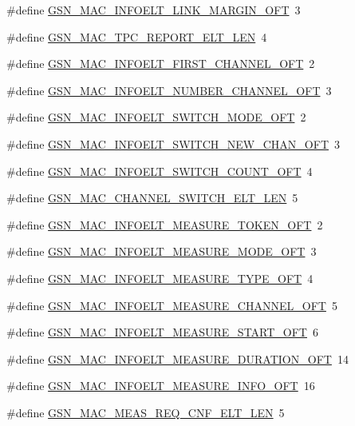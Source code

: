 \begin{DoxyCompactItemize}
\item 
\#define \hyperlink{a00523_ae8b1a15675809717ef0822acbbfeae8c}{GSN\_\-MAC\_\-INFOELT\_\-LINK\_\-MARGIN\_\-OFT}~3
\item 
\#define \hyperlink{a00523_a8b3dc7a4f3a87ec434c936270ed29efb}{GSN\_\-MAC\_\-TPC\_\-REPORT\_\-ELT\_\-LEN}~4
\item 
\#define \hyperlink{a00523_a42b172992af3c459dc559ac22c142875}{GSN\_\-MAC\_\-INFOELT\_\-FIRST\_\-CHANNEL\_\-OFT}~2
\item 
\#define \hyperlink{a00523_adfb3db38c2ffb6f66db4f583f0855cc9}{GSN\_\-MAC\_\-INFOELT\_\-NUMBER\_\-CHANNEL\_\-OFT}~3
\item 
\#define \hyperlink{a00523_a51d0f90dfe9b319189e3085e1cff5b56}{GSN\_\-MAC\_\-INFOELT\_\-SWITCH\_\-MODE\_\-OFT}~2
\item 
\#define \hyperlink{a00523_ac23cb4f8588df83f7df984663d6aa7f0}{GSN\_\-MAC\_\-INFOELT\_\-SWITCH\_\-NEW\_\-CHAN\_\-OFT}~3
\item 
\#define \hyperlink{a00523_ac73c521ebc537ec7c471bfc4d9c1cf77}{GSN\_\-MAC\_\-INFOELT\_\-SWITCH\_\-COUNT\_\-OFT}~4
\item 
\#define \hyperlink{a00523_ae941035bac3504c53e82208f096da3f0}{GSN\_\-MAC\_\-CHANNEL\_\-SWITCH\_\-ELT\_\-LEN}~5
\item 
\#define \hyperlink{a00523_abc9088ebe86d1584bc57d923ef64d1da}{GSN\_\-MAC\_\-INFOELT\_\-MEASURE\_\-TOKEN\_\-OFT}~2
\item 
\#define \hyperlink{a00523_a18d3f0813db70f5deab9d40f850f32de}{GSN\_\-MAC\_\-INFOELT\_\-MEASURE\_\-MODE\_\-OFT}~3
\item 
\#define \hyperlink{a00523_ab86f617d4f0260ea0e8b4ae686b94b1a}{GSN\_\-MAC\_\-INFOELT\_\-MEASURE\_\-TYPE\_\-OFT}~4
\item 
\#define \hyperlink{a00523_aca98476d8b5e07794819c88dbd952a14}{GSN\_\-MAC\_\-INFOELT\_\-MEASURE\_\-CHANNEL\_\-OFT}~5
\item 
\#define \hyperlink{a00523_a6f2385de7e177fa819b60a3199798cf1}{GSN\_\-MAC\_\-INFOELT\_\-MEASURE\_\-START\_\-OFT}~6
\item 
\#define \hyperlink{a00523_a0853262f4d49266ceb05f1a58e98a6a1}{GSN\_\-MAC\_\-INFOELT\_\-MEASURE\_\-DURATION\_\-OFT}~14
\item 
\#define \hyperlink{a00523_a73b7c6cc3c5dcd07ba484ea92546a712}{GSN\_\-MAC\_\-INFOELT\_\-MEASURE\_\-INFO\_\-OFT}~16
\item 
\#define \hyperlink{a00523_ac5c4e1dc3b51020d2b9e9100b8757a3b}{GSN\_\-MAC\_\-MEAS\_\-REQ\_\-CNF\_\-ELT\_\-LEN}~5
\item 

\end{DoxyCompactItemize}
